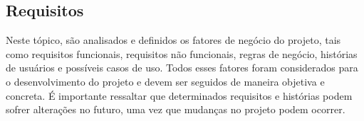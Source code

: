 \subsection{Requisitos}

Neste tópico, são analisados e definidos os fatores de negócio do projeto, tais como requisitos funcionais, requisitos não funcionais, regras de negócio, histórias de usuários e possíveis casos de uso. Todos esses fatores foram considerados para o desenvolvimento do projeto e devem ser seguidos de maneira objetiva e concreta. É importante ressaltar que determinados requisitos e histórias podem sofrer alterações no futuro, uma vez que mudanças no projeto podem ocorrer.